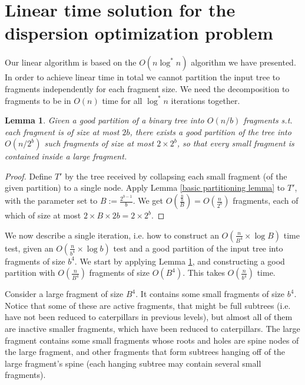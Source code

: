 \documentclass[11pt,a4paper]{article}
\newtheorem{lemma}{Lemma}
\theoremstyle{definition}
\theoremstyle{remark}
\begin{document}
\section{Linear time solution for the dispersion optimization problem}
Our linear algorithm is based on the $O(n \log ^*n)$ algorithm we have presented. In order to achieve linear time in total we cannot partition the input tree to fragments independently for each fragment size. We need the decomposition to fragments to be in $O(n)$ time for all $\log ^*n$ iterations together.
\begin{lemma}\label{good partition refinement lemma}
Given a good partition of a binary tree into $O(n/b)$ fragments s.t. each fragment is of size at most $2b$, there exists a good partition of the tree into $O(n/2^b)$ such fragments of size at most $2 \times 2^b$, so that every small fragment is contained inside a large fragment.
\end{lemma}
\begin{proof}
Define $T'$ by the tree received by collapsing each small fragment (of the given partition) to a single node. Apply Lemma \ref{basic partitioning lemma} to $T'$, with the parameter set to $B:= \frac{2^{b-1}}{b}$. We get $O(\frac{\frac{n}{b}}{B})=O(\frac{n}{2^b})$ fragments, each of which of size at most $2 \times B \times 2b = 2 \times 2^b$.
\end{proof}
We now describe a single iteration, i.e. how to construct an $O(\frac{n}{B^4} \times \log B)$ time test, given an $O(\frac{n}{b^4} \times \log b)$ test and a good partition of the input tree into fragments of size $b^4$. We start by applying Lemma \ref{good partition refinement lemma}, and constructing a good partition with $O(\frac{n}{B^4})$ fragments of size $O(B^4)$. This takes $O(\frac{n}{b^4})$ time.

Consider a large fragment of size $B^4$. It contains some small fragments of size $b^4$. Notice that some of these are active fragments, that might be full subtrees (i.e. have not been reduced to caterpillars in previous levels), but almost all of them are inactive smaller fragments, which have been reduced to caterpillars. The large fragment contains some small fragments whose roots and holes are spine nodes of the large fragment, and other fragments that form subtrees hanging off of the large fragment's spine (each hanging subtree may contain several small fragments). 
\end{document}
